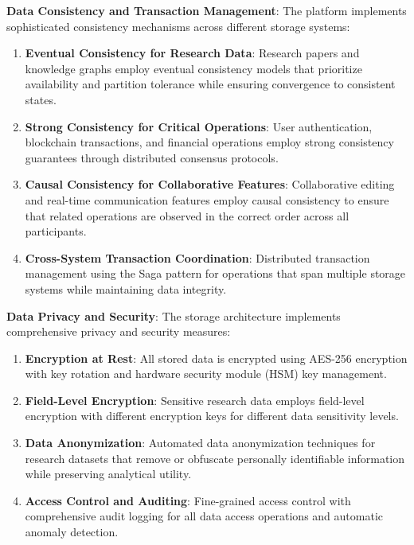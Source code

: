 \documentclass[10pt,twocolumn]{article}
\begin{document}
\textbf{Data Consistency and Transaction Management}: The platform implements sophisticated consistency mechanisms across different storage systems:

\begin{enumerate}
    \item \textbf{Eventual Consistency for Research Data}: Research papers and knowledge graphs employ eventual consistency models that prioritize availability and partition tolerance while ensuring convergence to consistent states.
    
    \item \textbf{Strong Consistency for Critical Operations}: User authentication, blockchain transactions, and financial operations employ strong consistency guarantees through distributed consensus protocols.
    
    \item \textbf{Causal Consistency for Collaborative Features}: Collaborative editing and real-time communication features employ causal consistency to ensure that related operations are observed in the correct order across all participants.
    
    \item \textbf{Cross-System Transaction Coordination}: Distributed transaction management using the Saga pattern for operations that span multiple storage systems while maintaining data integrity.
\end{enumerate}

\textbf{Data Privacy and Security}: The storage architecture implements comprehensive privacy and security measures:

\begin{enumerate}
    \item \textbf{Encryption at Rest}: All stored data is encrypted using AES-256 encryption with key rotation and hardware security module (HSM) key management.
    
    \item \textbf{Field-Level Encryption}: Sensitive research data employs field-level encryption with different encryption keys for different data sensitivity levels.
    
    \item \textbf{Data Anonymization}: Automated data anonymization techniques for research datasets that remove or obfuscate personally identifiable information while preserving analytical utility.
    
    \item \textbf{Access Control and Auditing}: Fine-grained access control with comprehensive audit logging for all data access operations and automatic anomaly detection.
\end{enumerate}
\end{document}
